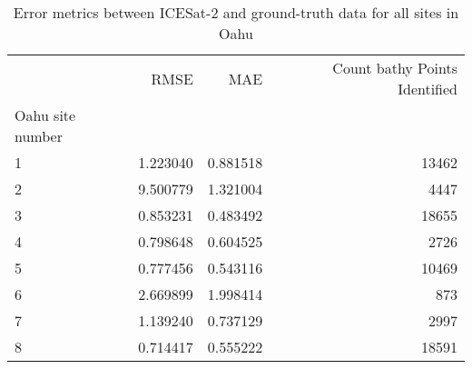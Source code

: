 \begin{table}[h!]
\caption{Error metrics between ICESat-2 and ground-truth data for all sites in Oahu}
\begin{tabular}{lrrr}
\toprule
 & RMSE & MAE & Count bathy Points Identified \\
Oahu site number &  &  &  \\
\midrule
1 & 1.223040 & 0.881518 & 13462 \\
2 & 9.500779 & 1.321004 & 4447 \\
3 & 0.853231 & 0.483492 & 18655 \\
4 & 0.798648 & 0.604525 & 2726 \\
5 & 0.777456 & 0.543116 & 10469 \\
6 & 2.669899 & 1.998414 & 873 \\
7 & 1.139240 & 0.737129 & 2997 \\
8 & 0.714417 & 0.555222 & 18591 \\
\bottomrule
\end{tabular}
\end{table}

